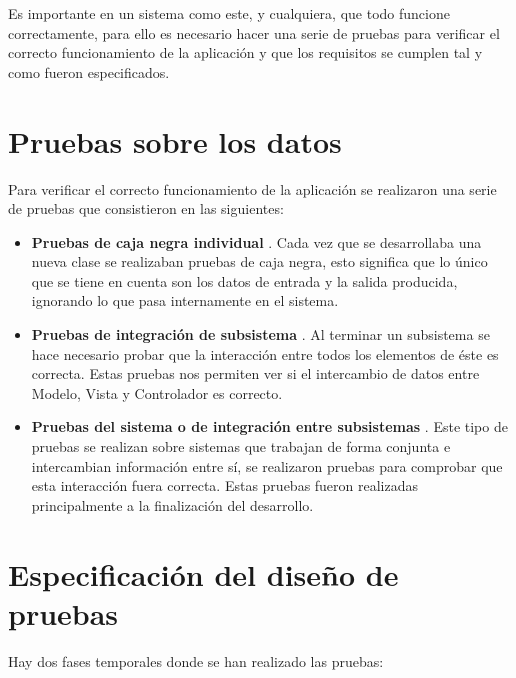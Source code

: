 Es importante en un sistema como este, y cualquiera, que todo funcione correctamente, para ello es necesario hacer una serie de pruebas para verificar el correcto funcionamiento de la aplicación y que los requisitos se cumplen tal y como fueron especificados.\\

\section{Pruebas sobre los datos}

Para verificar el correcto funcionamiento de la aplicación se realizaron una serie de pruebas que consistieron en las siguientes:

\begin{itemize}
\item {\bf Pruebas de caja negra individual} . Cada vez que se desarrollaba una nueva clase se realizaban pruebas de caja negra, esto significa que lo único que se tiene en cuenta son los datos de entrada y la salida producida, ignorando lo que pasa internamente en el sistema.

\item{\bf Pruebas de integración de subsistema} . Al terminar un subsistema se hace necesario probar que la interacción entre todos los elementos de éste es correcta. Estas pruebas nos permiten ver si el intercambio de datos entre Modelo, Vista y Controlador es correcto.

\item{\bf Pruebas del sistema o de integración entre subsistemas} . Este tipo de pruebas se realizan sobre sistemas que trabajan de forma conjunta e intercambian información entre sí, se realizaron pruebas para comprobar que esta interacción fuera correcta. Estas pruebas fueron realizadas principalmente a la finalización del desarrollo.
\end{itemize}


\section{Especificación del diseño de pruebas}

Hay dos fases temporales donde se han realizado las pruebas:

